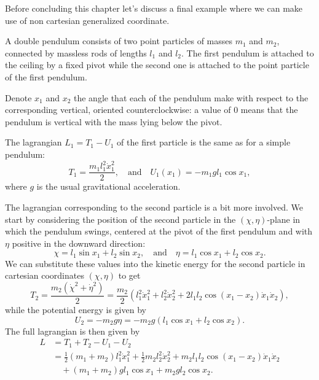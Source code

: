 \documentclass[english,fontsize=11pt,paper=a5,oneside]{scrbook}
\theoremstyle{definition}
\newenvironment{example}
  {\pushQED{\qed}\renewcommand{\qedsymbol}{$\lozenge$}\examplex}
  {\popQED\endexamplex}
\begin{document}
Before concluding this chapter let's discuss a final example where we can make use of non cartesian generalized coordinate.

\begin{example}[Double pendulum]\label{ex:2pendulum}
    A double pendulum consists of two point particles of masses $m_1$ and $m_2$, connected by massless rods of lengths $l_1$ and $l_2$. The first pendulum is attached to the ceiling by a fixed pivot while the second one is attached to the point particle of the first pendulum.

    Denote $x_1$ and $x_2$ the angle that each of the pendulum make with respect to the corresponding vertical, oriented counterclockwise: a value of $0$ means that the pendulum is vertical with the mass lying below the pivot.
    
    The lagrangian $L_1 = T_1 - U_1$ of the first particle is the same as for a simple pendulum:
    \begin{equation}
        T_1 = \frac{m_1 l_1^2 \dot x_1^2}2,
        \quad\mbox{and}\quad
        U_1(x_1) = -m_1 g l_1 \cos x_1,
    \end{equation}
    where $g$ is the usual gravitational acceleration.

    The lagrangian corresponding to the second particle is a bit more involved. We start by considering the position of the second particle in the $(\chi,\eta)$-plane in which the pendulum swings, centered at the pivot of the first pendulum and with $\eta$ positive in the downward direction:
    \begin{equation}
        \chi = l_1\sin x_1 + l_2\sin x_2,
        \quad\mbox{and}\quad
        \eta = l_1\cos x_1 + l_2\cos x_2.
    \end{equation}
    We can substitute these values into the kinetic energy for the second particle in cartesian coordinates $(\chi,\eta)$ to get
    \begin{equation}
        T_2 = \frac {m_2 (\dot\chi^2 + \dot\eta^2)}2
            = \frac {m_2}2 \left(
                l_1^2 \dot x_1^2 + l_2^2 \dot x_2^2
                + 2l_1l_2 \cos(x_1 -x_2)\dot x_1 \dot x_2
                \right),
    \end{equation}
    while the potential energy is given by
    \begin{equation}
        U_2 = -m_2 g \eta = -m_2g (l_1\cos x_1 + l_2\cos x_2).
    \end{equation}
    The full lagrangian is then given by
    \begin{align}
        L &= T_1 + T_2 - U_1 - U_2 \\
          &= \frac12 (m_1 + m_2)  l_1^2 \dot x_1^2
             + \frac 12 m_2 l_2^2 \dot x_2^2
             + m_2l_1l_2 \cos(x_1 -x_2)\dot x_1 \dot x_2 \\
             &\quad+ (m_1 + m_2) g l_1 \cos x_1
             + m_2gl_2\cos x_2.
    \end{align}


\end{example}
\end{document}
